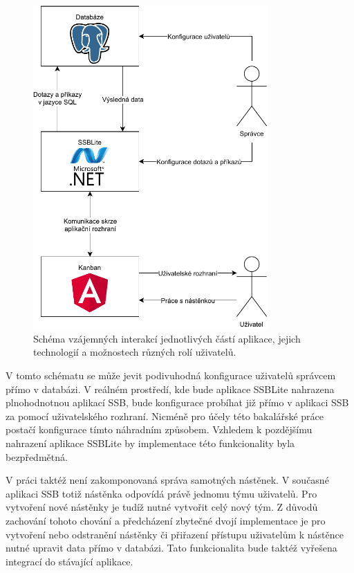 \begin{figure}[H]
    \label{img:scheme}
	\centering
	\includegraphics[width=0.8\textwidth]{obrazky-figures/app-scheme.pdf}
	\caption{Schéma vzájemných interakcí jednotlivých částí aplikace, jejich technologií a možnostech různých rolí uživatelů.}
\end{figure}

V tomto schématu se může jevit podivuhodná konfigurace uživatelů správcem přímo v databázi. V reálném prostředí, kde bude aplikace SSBLite nahrazena plnohodnotnou aplikací SSB, bude konfigurace probíhat již přímo v aplikaci SSB za pomocí uživatelského rozhraní. Nicméně pro účely této bakalářské práce postačí konfigurace tímto náhradním způsobem. Vzhledem k pozdějšímu nahrazení aplikace SSBLite by implementace této funkcionality byla bezpředmětná.

V práci taktéž není zakomponovaná správa samotných nástěnek. V současné aplikaci SSB totiž nástěnka odpovídá právě jednomu týmu uživatelů. Pro vytvoření nové nástěnky je tudíž nutné vytvořit celý nový tým. Z důvodů zachování tohoto chování a předcházení zbytečné dvojí implementace je pro vytvoření nebo odstranění nástěnky či přiřazení přístupu uživatelům k nástěnce nutné upravit data přímo v databázi. Tato funkcionalita bude taktéž vyřešena integrací do stávající aplikace.

